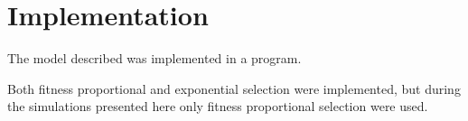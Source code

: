 \section{Implementation} \label{sec:implem}
The model described was implemented in a \matlab program.



Both fitness proportional and exponential selection were implemented, but during the simulations presented here only fitness proportional selection were used. 

